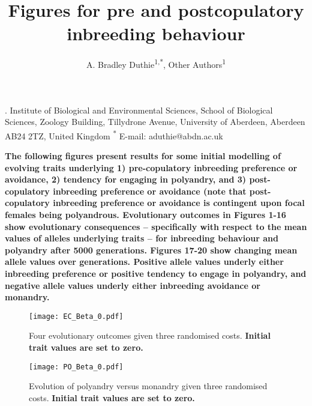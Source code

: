 \documentclass[12pt]{article}
\title{Figures for pre and postcopulatory inbreeding behaviour}
\author{A. Bradley Duthie\textsuperscript{1,*}, Other Authors\textsuperscript{1}}
\date{}
\begin{document}
\maketitle

\begin{center}
\vspace{5 mm}

. Institute of Biological and Environmental Sciences, School of Biological Sciences, Zoology Building, Tillydrone Avenue, University of Aberdeen, Aberdeen AB24 2TZ, United Kingdom \textsuperscript{*} E-mail: aduthie@abdn.ac.uk \\ 
\newline
\end{center}

\vspace{15 mm}

\noindent\textbf{The following figures present results for some initial modelling of evolving traits underlying 1) pre-copulatory inbreeding preference or avoidance, 2) tendency for engaging in polyandry, and 3) post-copulatory inbreeding preference or avoidance (note that post-copulatory inbreeding preference or avoidance is contingent upon focal females being polyandrous. Evolutionary outcomes in Figures 1-16 show evolutionary consequences -- specifically with respect to the mean values of alleles underlying traits -- for inbreeding behaviour and polyandry after 5000 generations. Figures 17-20 show changing mean allele values over generations. Positive allele values underly either inbreeding preference or positive tendency to engage in polyandry, and negative allele values underly either inbreeding avoidance or monandry.}



\begin{figure}
\begin{center}				
\texttt{[image: EC\_Beta\_0.pdf]}
\end{center}
\caption{Four evolutionary outcomes given three randomised costs. \textbf{Initial trait values are set to zero.}}
\end{figure}

\begin{figure}
\begin{center}				
\texttt{[image: PO\_Beta\_0.pdf]}
\end{center}
\caption{Evolution of polyandry versus monandry given three randomised costs. \textbf{Initial trait values are set to zero.}}
\end{figure}
\end{document}
